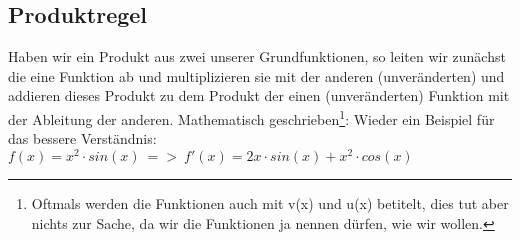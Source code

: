 \subsection{Produktregel}
	Haben wir ein Produkt aus zwei unserer Grundfunktionen, so leiten wir zunächst
	die eine Funktion ab und multiplizieren sie mit der anderen (unveränderten) und
	addieren dieses Produkt zu dem Produkt der einen (unveränderten) Funktion mit
	der Ableitung der anderen. Mathematisch geschrieben\footnote{Oftmals werden die
	Funktionen auch mit v(x) und u(x) betitelt, dies tut aber nichts zur Sache, da
	wir die Funktionen ja nennen dürfen, wie wir wollen.}:
	\formel{\[h'(x)=(f(x)\cdot g(x))' = f'(x)\cdot g(x)+f(x)\cdot g'(x)\]}
	Wieder ein Beispiel für das bessere Verständnis: \(f(x)=x^2\cdot sin(x)\ =>\
	f'(x)=2x\cdot sin(x)+x^2\cdot cos(x)\)
